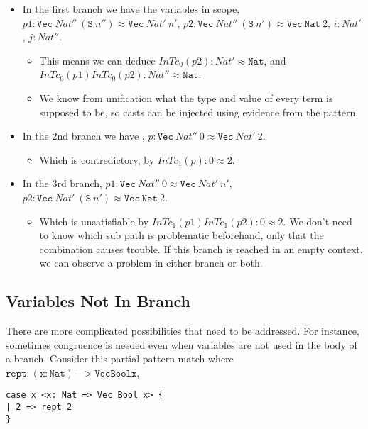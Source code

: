 \begin{itemize}
\item
In the first branch we have the variables in scope, $p1:\mathtt{Vec}\ Nat''\ (\mathtt{S}\ n'')\approx\mathtt{Vec}\ Nat'\ n'$, $p2:\mathtt{Vec}\ Nat''\ (\mathtt{S}\ n')\approx\mathtt{Vec}\ \mathtt{Nat}\ 2$, $i:Nat'$, $j:Nat''$.
\begin{itemize}
\item 
This means we can deduce $InTc_{0}(p2):Nat'\approx\mathtt{Nat}$, and $InTc_{0}(p1)InTc_{0}(p2):Nat''\approx\mathtt{Nat}$.
\item 
We know from unification what the type and value of every term is supposed to be, so casts can be injected using evidence from the pattern.
\end{itemize}
\item 
In the 2nd branch we have , $p:\mathtt{Vec}\ Nat''\ 0\approx\mathtt{Vec}\ Nat'\ 2$.
\begin{itemize}
\item 
Which is contredictory, by $InTc_{1}(p):0\approx2$.
\end{itemize}
\item 
{}
In the 3rd branch, $p1:\mathtt{Vec}\ Nat''\ 0\approx\mathtt{Vec}\ Nat'\ n'$, $p2:\mathtt{Vec}\ Nat'\ (\mathtt{S}\ n')\approx\mathtt{Vec}\ \mathtt{Nat}\ 2$. 
\begin{itemize}
\item
Which is unsatisfiable by $InTc_{1}(p1)InTc_{1}(p2):0\approx2$.
We don't need to know which sub path is problematic beforehand, only that the combination causes trouble.
If this branch is reached in an empty context, we can observe a problem in either branch or both.
\end{itemize}
\end{itemize}

\subsection{Variables Not In Branch}
There are more complicated possibilities that need to be addressed.
For instance, sometimes congruence is needed even when variables are not used in the body of a branch.
Consider this partial pattern match where $\mathtt{rept: (x: Nat) -> Vec Bool x}$,

\begin{lstlisting}[basicstyle={\ttfamily\small}]
case x <x: Nat => Vec Bool x> {
| 2 => rept 2
}
\end{lstlisting}

